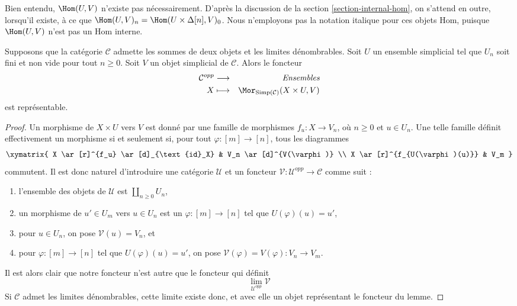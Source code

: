 \noindent
Bien entendu, $\Hom(U, V)$ n'existe pas nécessairement. D'après la
discussion de la section \ref{section-internal-hom}, on s'attend en outre,
lorsqu'il existe, à ce que
$\Hom(U, V)_n = \Hom(U \times \Delta[n], V)_0$.
Nous n'employons pas la notation italique pour ces objets Hom, puisque
$\Hom(U, V)$ n'est pas un Hom interne.

\begin{lemma}
\label{lemma-exists-hom-0-from-simplicial-set}
Supposons que la catégorie $\mathcal{C}$ admette les sommes de deux objets
et les limites dénombrables. Soit $U$ un ensemble simplicial tel que $U_n$
soit fini et non vide pour tout $n \geq 0$. Soit $V$ un objet simplicial
de $\mathcal{C}$. Alors le foncteur
\begin{eqnarray*}
\mathcal{C}^{opp} & \longrightarrow & \textit{Ensembles} \\
X
& \longmapsto &
\Mor_{\text{Simp}(\mathcal{C})}(X \times U, V)
\end{eqnarray*}
est représentable.
\end{lemma}

\begin{proof}
Un morphisme de $X \times U$ vers $V$ est donné par une famille de
morphismes $f_u : X \to V_n$, où $n \geq 0$ et $u \in U_n$.
Une telle famille définit effectivement un morphisme si et seulement si,
pour tout $\varphi : [m] \to [n]$, tous les diagrammes
$$
\xymatrix{
X \ar[r]^{f_u} \ar[d]_{\text{id}_X} & V_n \ar[d]^{V(\varphi)} \\
X \ar[r]^{f_{U(\varphi)(u)}} & V_m
}
$$
commutent. Il est donc naturel d'introduire une catégorie $\mathcal{U}$
et un foncteur
$\mathcal{V} : \mathcal{U}^{opp} \to \mathcal{C}$
comme suit :
\begin{enumerate}
\item l'ensemble des objets de $\mathcal{U}$ est
$\coprod_{n \geq 0} U_n$,
\item un morphisme de $u' \in U_m$ vers $u \in U_n$ est un
$\varphi : [m] \to [n]$ tel que $U(\varphi)(u) = u'$,
\item pour $u \in U_n$, on pose $\mathcal{V}(u) = V_n$, et
\item pour $\varphi : [m] \to [n]$ tel que $U(\varphi)(u) = u'$,
on pose $\mathcal{V}(\varphi) = V(\varphi) : V_n \to V_m$.
\end{enumerate}
Il est alors clair que notre foncteur n'est autre que le foncteur qui
définit
$$
\lim_{\mathcal{U}^{opp}} \mathcal{V}
$$
Si $\mathcal{C}$ admet les limites dénombrables, cette limite existe donc,
et avec elle un objet représentant le foncteur du lemme.
\end{proof}

